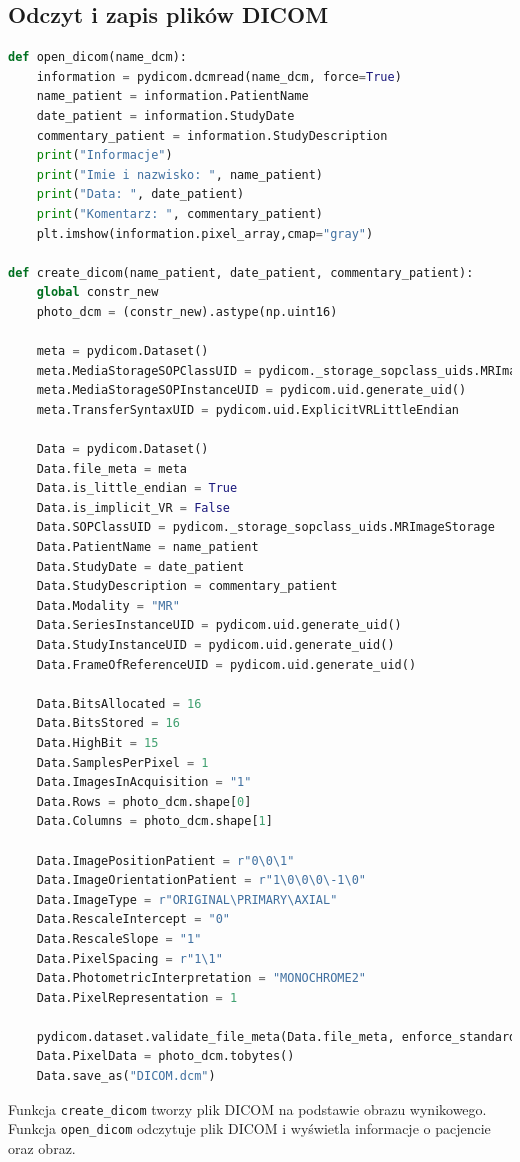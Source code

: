 \documentclass[11pt,a4paper]{article}
\begin{document}
    \subsection{Odczyt i zapis plików DICOM}
    \begin{lstlisting}[language=Python, basicstyle=\normal, breaklines=true]
def open_dicom(name_dcm):
    information = pydicom.dcmread(name_dcm, force=True)
    name_patient = information.PatientName
    date_patient = information.StudyDate
    commentary_patient = information.StudyDescription
    print("Informacje")
    print("Imie i nazwisko: ", name_patient)
    print("Data: ", date_patient)
    print("Komentarz: ", commentary_patient)
    plt.imshow(information.pixel_array,cmap="gray")

def create_dicom(name_patient, date_patient, commentary_patient):
    global constr_new
    photo_dcm = (constr_new).astype(np.uint16)

    meta = pydicom.Dataset()
    meta.MediaStorageSOPClassUID = pydicom._storage_sopclass_uids.MRImageStorage
    meta.MediaStorageSOPInstanceUID = pydicom.uid.generate_uid()
    meta.TransferSyntaxUID = pydicom.uid.ExplicitVRLittleEndian

    Data = pydicom.Dataset()
    Data.file_meta = meta
    Data.is_little_endian = True
    Data.is_implicit_VR = False
    Data.SOPClassUID = pydicom._storage_sopclass_uids.MRImageStorage
    Data.PatientName = name_patient
    Data.StudyDate = date_patient
    Data.StudyDescription = commentary_patient
    Data.Modality = "MR"
    Data.SeriesInstanceUID = pydicom.uid.generate_uid()
    Data.StudyInstanceUID = pydicom.uid.generate_uid()
    Data.FrameOfReferenceUID = pydicom.uid.generate_uid()

    Data.BitsAllocated = 16
    Data.BitsStored = 16
    Data.HighBit = 15
    Data.SamplesPerPixel = 1
    Data.ImagesInAcquisition = "1"
    Data.Rows = photo_dcm.shape[0]
    Data.Columns = photo_dcm.shape[1]

    Data.ImagePositionPatient = r"0\0\1"
    Data.ImageOrientationPatient = r"1\0\0\0\-1\0"
    Data.ImageType = r"ORIGINAL\PRIMARY\AXIAL"
    Data.RescaleIntercept = "0"
    Data.RescaleSlope = "1"
    Data.PixelSpacing = r"1\1"
    Data.PhotometricInterpretation = "MONOCHROME2"
    Data.PixelRepresentation = 1

    pydicom.dataset.validate_file_meta(Data.file_meta, enforce_standard=True)
    Data.PixelData = photo_dcm.tobytes()
    Data.save_as("DICOM.dcm")
    \end{lstlisting}
    Funkcja \texttt{create\_dicom} tworzy plik DICOM na podstawie obrazu wynikowego.
    Funkcja \texttt{open\_dicom} odczytuje plik DICOM i wyświetla informacje o pacjencie oraz obraz.
\end{document}
